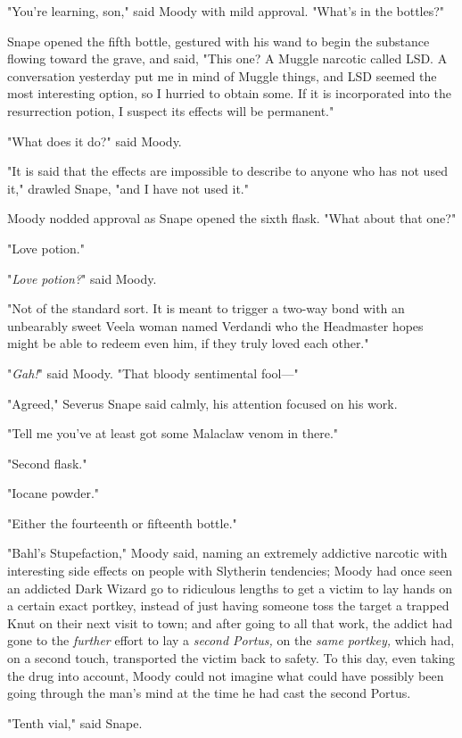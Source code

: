 "You're learning, son," said Moody with mild approval. "What's in the bottles?"

Snape opened the fifth bottle, gestured with his wand to begin the substance 
flowing toward the grave, and said, "This one? A Muggle narcotic called LSD. A 
conversation yesterday put me in mind of Muggle things, and LSD seemed the most 
interesting option, so I hurried to obtain some. If it is incorporated into the 
resurrection potion, I suspect its effects will be permanent."

"What does it do?" said Moody.

"It is said that the effects are impossible to describe to anyone who has not 
used it," drawled Snape, "and I have not used it."

Moody nodded approval as Snape opened the sixth flask. "What about that one?"

"Love potion."

"\emph{Love potion?}" said Moody.

"Not of the standard sort. It is meant to trigger a two-way bond with an 
unbearably sweet Veela woman named Verdandi who the Headmaster hopes might be 
able to redeem even him, if they truly loved each other."

"\emph{Gah!}" said Moody. "That bloody sentimental fool---"

"Agreed," Severus Snape said calmly, his attention focused on his work.

"Tell me you've at least got some Malaclaw venom in there."

"Second flask."

"Iocane powder."

"Either the fourteenth or fifteenth bottle."

"Bahl's Stupefaction," Moody said, naming an extremely addictive narcotic with 
interesting side effects on people with Slytherin tendencies; Moody had once 
seen an addicted Dark Wizard go to ridiculous lengths to get a victim to lay 
hands on a certain exact portkey, instead of just having someone toss the 
target a trapped Knut on their next visit to town; and after going to all that 
work, the addict had gone to the \emph{further} effort to lay a\emph{ second 
Portus,} on the\emph{ same portkey,} which had, on a second touch, transported 
the victim back to safety. To this day, even taking the drug into account, 
Moody could not imagine what could have possibly been going through the man's 
mind at the time he had cast the second Portus.

"Tenth vial," said Snape.

